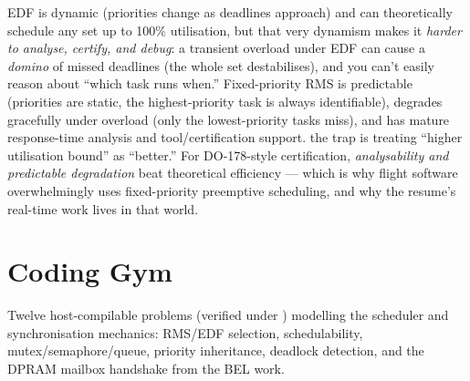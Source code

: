 EDF is dynamic (priorities change as deadlines approach) and can theoretically
schedule any set up to 100\% utilisation, but that very dynamism makes it
\emph{harder to analyse, certify, and debug}: a transient overload under EDF can
cause a \emph{domino} of missed deadlines (the whole set destabilises), and you
can't easily reason about ``which task runs when.'' Fixed-priority RMS is
predictable (priorities are static, the highest-priority task is always
identifiable), degrades gracefully under overload (only the lowest-priority
tasks miss), and has mature response-time analysis and tool/certification
support. \trap the trap is treating ``higher utilisation bound'' as ``better.''
For DO-178-style certification, \emph{analysability and predictable degradation}
beat theoretical efficiency --- which is why flight software overwhelmingly uses
fixed-priority preemptive scheduling, and why the resume's real-time work lives
in that world.

\section{Coding Gym}

\begin{partnote}
Twelve host-compilable problems (verified under
) modelling the scheduler and synchronisation
mechanics: RMS/EDF selection, schedulability, mutex/semaphore/queue, priority
inheritance, deadlock detection, and the DPRAM mailbox handshake from the BEL
work.
\end{partnote}

